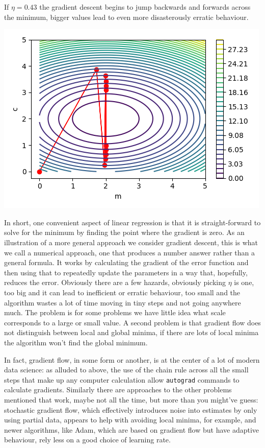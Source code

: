 \documentclass[12pt]{article}
\begin{document}
If $\eta=0.43$ the gradient descent begins to jump backwards and
forwards across the minimum, bigger values lead to even more
disasterously erratic behaviour.
\begin{center}
  \includegraphics[]{02.3_gradient_big_eta.png}
  \end{center}


In short, one convenient aspect of linear regression is that it is
straight-forward to solve for the minimum by finding the point where
the gradient is zero. As an illustration of a more general approach we
consider gradient descent, this is what we call a numerical approach,
one that produces a number answer rather than a general formula. It
works by calculating the gradient of the error function and then using
that to repeatedly update the parameters in a way that, hopefully,
reduces the error. Obviously there are a few hazards, obviously
picking $\eta$ is one, too big and it can lead to inefficient or
erratic behaviour, too small and the algorithm wastes a lot of time
moving in tiny steps and not going anywhere much. The problem is for
some problems we have little idea what scale corresponds to a large or
small value. A second problem is that gradient flow does not
distinguish between local and global minima, if there are lots of
local minima the algorithm won't find the global minimum.

In fact, gradient flow, in some form or another, is at the center of a
lot of modern data science: as alluded to above, the use of the chain
rule across all the small steps that make up any computer calculation
allow \texttt{autograd} commands to calculate gradients. Similarly
there are approaches to the other problems mentioned that work, maybe
not all the time, but more than you might've guess: stochastic
gradient flow, which effectively introduces noise into estimates by
only using partial data, appears to help with avoiding local minima,
for example, and newer algorithms, like Adam, which are based on
gradient flow but have adaptive behaviour, rely less on a good choice
of learning rate.
\end{document}
